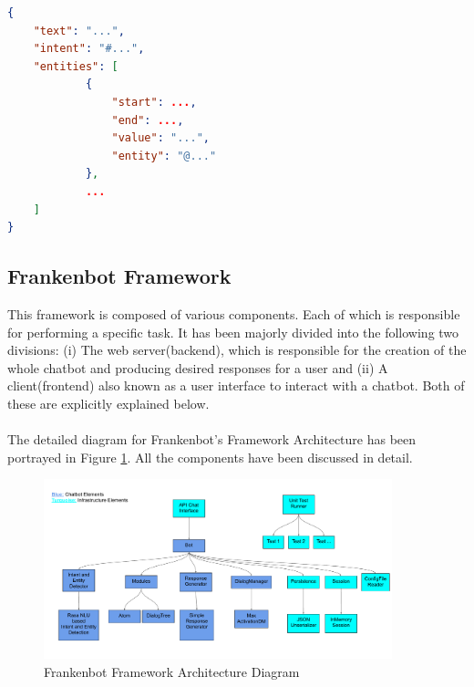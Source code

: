  \begin{minipage}{\linewidth}
\begin{lstlisting}[language=json,firstnumber=1, caption=JSON Objects for common\_examples., label={lst:commonExampJson}]
{
    "text": "...",
    "intent": "#...",
    "entities": [
            {
                "start": ...,
                "end": ...,
                "value": "...",
                "entity": "@..."
            },
            ...
    ]
}
\end{lstlisting}
\end{minipage}

\subsection{Frankenbot Framework}
This framework is composed of various components. Each of which is responsible for performing a specific task. It has been majorly divided into the following two divisions: (i) The web server(backend), which is responsible for the creation of the whole chatbot and producing desired responses for a user and (ii) A client(frontend) also known as a user interface to interact with a chatbot. Both of these are explicitly explained below.
\\~\\
The detailed diagram for Frankenbot's Framework Architecture has been portrayed in Figure \ref{fig:frankArch}. All the components have been discussed in detail.

\begin{figure}[!h]
    \centering
    \includegraphics[width=0.9\textwidth]{img/Frankenbot_Architecture_Diagram_Updated.pdf}
    \caption{Frankenbot Framework Architecture Diagram}
    \label{fig:frankArch}
\end{figure} 

